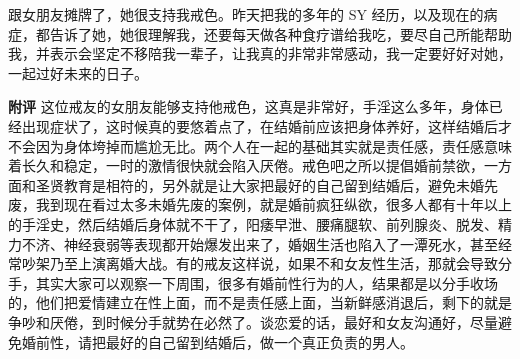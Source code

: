 \begin{case}
    跟女朋友摊牌了，她很支持我戒色。昨天把我的多年的 SY 经历，以及现在的病症，都告诉了她，她很理解我，还要每天做各种食疗谱给我吃，要尽自己所能帮助我，并表示会坚定不移陪我一辈子，让我真的非常非常感动，我一定要好好对她，一起过好未来的日子。

    \textbf{附评} 这位戒友的女朋友能够支持他戒色，这真是非常好，手淫这么多年，身体已经出现症状了，这时候真的要悠着点了，在结婚前应该把身体养好，这样结婚后才不会因为身体垮掉而尴尬无比。两个人在一起的基础其实就是责任感，责任感意味着长久和稳定，一时的激情很快就会陷入厌倦。戒色吧之所以提倡婚前禁欲，一方面和圣贤教育是相符的，另外就是让大家把最好的自己留到结婚后，避免未婚先废，我到现在看过太多未婚先废的案例，就是婚前疯狂纵欲，很多人都有十年以上的手淫史，然后结婚后身体就不干了，阳痿早泄、腰痛腿软、前列腺炎、脱发、精力不济、神经衰弱等表现都开始爆发出来了，婚姻生活也陷入了一潭死水，甚至经常吵架乃至上演离婚大战。有的戒友这样说，如果不和女友性生活，那就会导致分手，其实大家可以观察一下周围，很多有婚前性行为的人，结果都是以分手收场的，他们把爱情建立在性上面，而不是责任感上面，当新鲜感消退后，剩下的就是争吵和厌倦，到时候分手就势在必然了。谈恋爱的话，最好和女友沟通好，尽量避免婚前性，请把最好的自己留到结婚后，做一个真正负责的男人。
\end{case}

